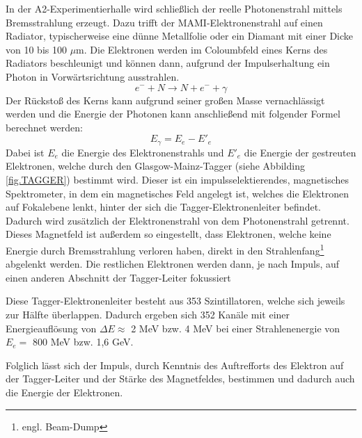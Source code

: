 \documentclass[a4paper,11pt,oneside,final,german,openbib,pdftex]{scrbook}
\begin{document}
{ In der A2-Experimentierhalle wird schlie{\ss}lich der reelle Photonenstrahl mittels Bremsstrahlung erzeugt. Dazu trifft der MAMI-Elektronenstrahl auf einen Radiator, typischerweise eine d\"unne Metallfolie oder ein Diamant mit einer Dicke von 10 bis 100 $\mu$m. Die Elektronen werden im Coloumbfeld eines Kerns des Radiators beschleunigt und k\"onnen dann, aufgrund der Impulserhaltung ein Photon in Vorw\"artsrichtung ausstrahlen.
 \begin{equation}
 e^{-}+N\rightarrow N + e^{-}+\gamma
 \label{eq.Streuung}
 \end{equation}
  Der R\"ucksto{\ss} des Kerns kann aufgrund seiner gro{\ss}en Masse vernachl\"assigt werden und die Energie der Photonen kann anschlie{\ss}end mit folgender Formel berechnet werden:
  \begin{equation}
  E_{\gamma}= E_{e^{}}-E{'}_{e}
  \label{eq.Photonenenergie}
  \end{equation}
 Dabei ist $E_e$ die Energie des Elektronenstrahls und $E'_{e}$ die Energie der gestreuten Elektronen, welche durch den Glasgow-Mainz-Tagger (siehe Abbilding \ref{fig.TAGGER}) bestimmt wird.
 Dieser ist ein impulsselektierendes, magnetisches Spektrometer, in dem ein magnetisches Feld angelegt ist, welches die Elektronen auf Fokalebene lenkt, hinter der sich die Tagger-Elektronenleiter befindet. Dadurch wird zus\"atzlich der Elektronenstrahl von dem Photonenstrahl getrennt. Dieses Magnetfeld ist außerdem so eingestellt, dass Elektronen, welche keine Energie durch Bremsstrahlung verloren haben, direkt in den Strahlenfang\footnote{engl. Beam-Dump} abgelenkt werden. Die restlichen Elektronen werden dann, je nach Impuls, auf einen anderen Abschnitt der Tagger-Leiter fokussiert
 
 Diese Tagger-Elektronenleiter besteht aus 353 Szintillatoren, welche sich jeweils zur H\"alfte \"uberlappen.
 Dadurch ergeben sich 352 Kan\"ale mit einer Energieaufl\"osung von $\Delta E \approx$  2 MeV bzw. 4 MeV bei einer Strahlenenergie von $E_e=$ 800 MeV bzw. 1,6 GeV. 
 
 Folglich lässt sich der Impuls, durch Kenntnis des Auftrefforts des Elektron auf der Tagger-Leiter und der St\"arke des Magnetfeldes, bestimmen und dadurch auch die Energie der Elektronen.
 
}
\end{document}
